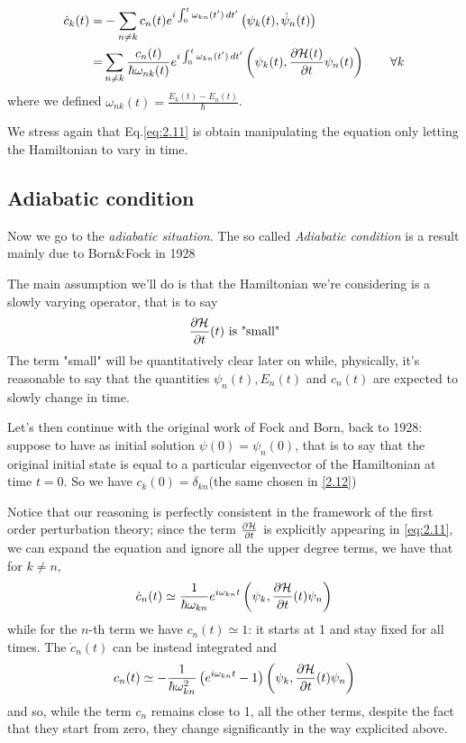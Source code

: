 \begin{align}
\dot{c}_k(t)=&-\sum_{n\neq k}c_n(t)e^{i\int_0^t\omega_{kn}(t')\mathop{}\!d t'} \left(\psi_k(t),\dot{\psi}_n(t)\right) \\
=&\sum_{n\neq k} \frac{c_n(t)}{\hbar\omega_{nk}(t)}e^{i\int_0^t\omega_{kn}(t')\mathop{}\!d t'}\left(\psi_k(t),\frac{\partial \mathcal{H}(t)}{\partial t}\psi_n(t) \right) \qquad \forall k 
\label{eq:2.11}
\end{align}
where we defined $ \omega_{nk}(t)=\frac{E_k(t)-E_n(t)}{\hbar} $.
\begin{rem}
	We stress again that Eq.\eqref{eq:2.11} is obtain manipulating the \Sch equation only letting the Hamiltonian to vary in time.
\end{rem}

\subsection{Adiabatic condition}
Now we go to the \emph{adiabatic situation}. The so called \emph{Adiabatic condition} is a result mainly due to Born\&Fock in 1928 \cite{born1928m}

The main assumption we'll do is that the Hamiltonian we're considering is a slowly varying operator, that is to say
\begin{equation}
\frac{\partial \mathcal{H}}{\partial t}(t) \text{ is "small"}
\end{equation}
The term "small" will be quantitatively clear later on while, physically, it's reasonable to say that the quantities $ \psi_n(t), E_n(t) $ and $ c_n(t) $ are expected to slowly change in time.

Let's then continue with the original work of Fock and Born, back to 1928: suppose to have as initial solution $ \psi(0)=\psi_n(0) $, that is to say that the original initial state is equal to a particular eigenvector of the Hamiltonian at time $ t=0 $. So we have $ c_k(0)=\delta_{kn} $(the same chosen in \eqref{2.12})

Notice that our reasoning is perfectly consistent in the framework of the first order perturbation theory; since the term $ \frac{\partial \mathcal{H}}{\partial t} $ is explicitly appearing in \eqref{eq:2.11}, we can expand the equation and ignore all the upper degree terms, we have that for $ k\neq n $, 
\begin{equation}
\dot{c}_n(t)\simeq \dfrac{1}{\hbar\omega_{kn}}e^{i\omega_{kn}t}\left(\psi_k,\frac{\partial \mathcal{H}}{\partial t}(t)\psi_n\right)
\end{equation}
while for the $ n $-th term we have $ c_n(t)\simeq 1 $: it starts at 1 and stay fixed for all times. 
The $ \dot{c}_n(t) $ can be instead integrated and 
\begin{equation}
c_n(t)\simeq -\dfrac{1}{\hbar\omega_{kn}^2}\left(e^{i\omega_{kn}t}-1\right)\left(\psi_k,\frac{\partial \mathcal{H}}{\partial t}(t)\psi_n\right)
\end{equation}
and so, while the term $ c_n $ remains close to 1, all the other terms, despite the fact that they start from zero, they change significantly in the way explicited above. 

